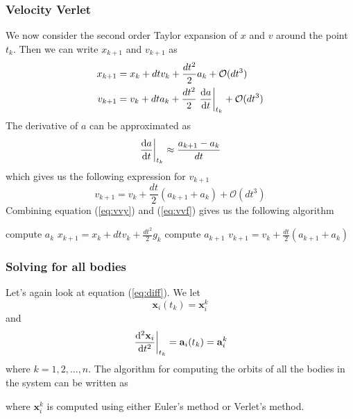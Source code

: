 \subsubsection{Velocity Verlet}
\label{sec:vv}
We now consider the second order Taylor expansion of $x$ and $v$ around the point $t_k$. Then we can write $x_{k+1}$ and $v_{k+1}$ as
\begin{align} \label{eq:vvy}
	x_{k+1}&=x_k + dtv_k + \frac{dt^2}{2}a_k  +\mathcal{O}(dt^3) \\
	v_{k+1}&=v_k + dta_k + \frac{dt^2}{2}\left.\dv{a}{t}\right\rvert_{t_k}  +\mathcal{O}(dt^3)
\end{align}
The derivative of $a$ can be approximated as
\begin{equation}
	 \left.\dv{a}{t}\right\rvert_{t_k} \approx \frac{a_{k+1}-a_k}{dt}
\end{equation}
which gives us the following expression for $v_{k+1}$
\begin{equation}\label{eq:vvf}
	v_{k+1}=v_k + \frac{dt}{2}\left(a_{k+1} + a_k \right)  +\mathcal{O}(dt^3)
\end{equation}
Combining equation (\ref{eq:vvy}) and (\ref{eq:vvf}) gives us the following algorithm
\begin{algorithm}[h!]
	\SetAlgoLined
		compute $a_k$\;
		$x_{k+1} = x_k+dtv_k+\frac{dt^2}{2}g_k$\;
		compute $a_{k+1}$\;
		$v_{k+1} = v_k + \frac{dt}{2}\left(a_{k+1}+a_k\right)$\;
\end{algorithm}

\subsubsection{Solving for all bodies}
Let's again look at equation (\ref{eq:diff}). We let
\begin{equation}
\mathbf{x}_i(t_k)=\mathbf{x}_{i}^k
\end{equation}
and
\begin{equation}
\left.\dv[2]{\mathbf{x}_i}{t}\right\rvert_{t_k} = \mathbf{a}_i(t_k)=\mathbf{a}_{i}^k
\end{equation}
where $k=1,2,\ldots,n$. The algorithm for computing the orbits of all the bodies in the system can be written as
\begin{algorithm}[h!]
	\SetAlgoLined
\end{algorithm}
where $\mathbf{x}_{i}^k$ is computed using either Euler's method or Verlet's method.

